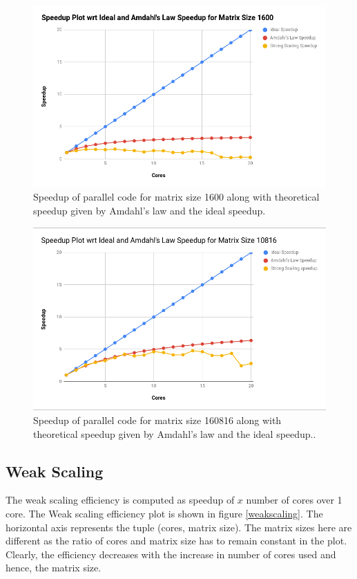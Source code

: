 \documentclass{article}
\begin{document}
\begin{spacing}{1.1}
\begin{center}
	\begin{figure}[H]
	\centering
       \includegraphics[scale=.40]{speedup1600_pr2.png}
        \caption{\label{Speedup1600} Speedup of parallel code for matrix size 1600 along with theoretical speedup given by Amdahl's law and the ideal speedup.} 
	\end{figure}
\end{center}

\begin{center}
	\begin{figure}[H]
	\centering
       \includegraphics[scale=.40]{speedup10816_pr2.png}
        \caption{\label{Speedup10816} Speedup of parallel code for matrix size 160816 along with theoretical speedup given by Amdahl's law and the ideal speedup..} 
	\end{figure}
\end{center}

\subsection{Weak Scaling}
The weak scaling efficiency is computed as speedup of $x$ number of cores over 1 core. 
The Weak scaling efficiency plot is shown in figure \ref{weakscaling}. The horizontal axis represents the tuple (cores, matrix size). The matrix sizes here are different as the ratio of cores and matrix size has to remain constant in the plot. Clearly, the efficiency decreases with the increase in number of cores used and hence, the matrix size.



\end{spacing}
\end{document}
